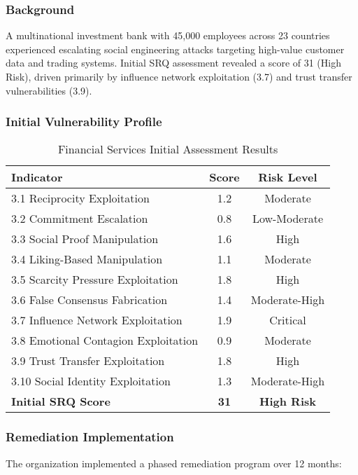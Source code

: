 \documentclass[11pt,a4paper]{article}
\begin{document}
\subsubsection{Background}

A multinational investment bank with 45,000 employees across 23 countries experienced escalating social engineering attacks targeting high-value customer data and trading systems. Initial SRQ assessment revealed a score of 31 (High Risk), driven primarily by influence network exploitation (3.7) and trust transfer vulnerabilities (3.9).

\subsubsection{Initial Vulnerability Profile}

\begin{table}[H]
\centering
\caption{Financial Services Initial Assessment Results}
\begin{tabular}{lcc}
\toprule
Indicator & Score & Risk Level \\
\midrule
3.1 Reciprocity Exploitation & 1.2 & Moderate \\
3.2 Commitment Escalation & 0.8 & Low-Moderate \\
3.3 Social Proof Manipulation & 1.6 & High \\
3.4 Liking-Based Manipulation & 1.1 & Moderate \\
3.5 Scarcity Pressure Exploitation & 1.8 & High \\
3.6 False Consensus Fabrication & 1.4 & Moderate-High \\
3.7 Influence Network Exploitation & 1.9 & Critical \\
3.8 Emotional Contagion Exploitation & 0.9 & Moderate \\
3.9 Trust Transfer Exploitation & 1.8 & High \\
3.10 Social Identity Exploitation & 1.3 & Moderate-High \\
\midrule
\textbf{Initial SRQ Score} & \textbf{31} & \textbf{High Risk} \\
\bottomrule
\end{tabular}
\end{table}

\subsubsection{Remediation Implementation}

The organization implemented a phased remediation program over 12 months:
\end{document}
